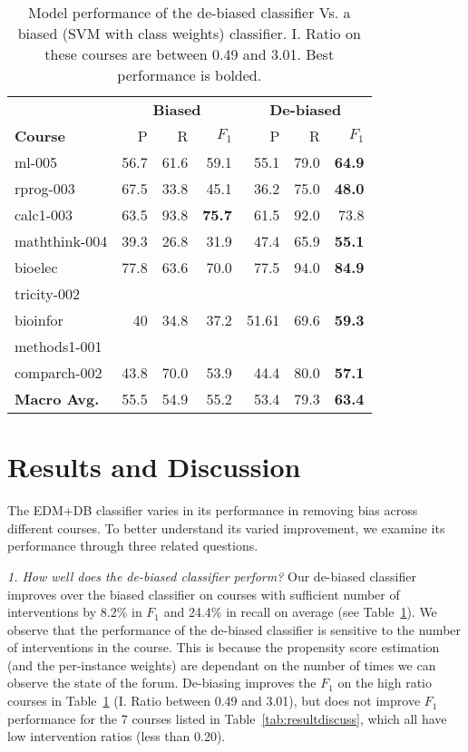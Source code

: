 \documentclass[11pt,a4paper]{article}
\begin{document}
\begin{table}
\centering
\def\arraystretch{1.15}%
\scriptsize
\begin{tabular}{|l|r|r|r||r|r|r|}
\hline
 &
 \multicolumn{3}{c||}{\textbf{Biased}} &
 \multicolumn{3}{c|}{\textbf{De-biased}} \\
 \cline{2-7}
\bf Course&  P&  R& $F_1$&  P&  R& $F_1$\\
\hline
\hline
{\sc ml-005} & 56.7& 61.6& 59.1& 55.1 & 79.0& \textbf{64.9}\\
\hline
{\sc rprog-003} & 67.5& 33.8& 45.1& 36.2& 75.0& \textbf{48.0}\\
\hline
{\sc calc1-003} & 63.5& 93.8& \textbf{75.7}& 61.5& 92.0& 73.8\\
\hline
{\sc maththink-004} & 39.3& 26.8& 31.9& 47.4& 65.9& \textbf{55.1}\\
\hline
{\sc bioelec} & 77.8& 63.6& 70.0& 77.5& 94.0& \textbf{84.9}\\
{\sc tricity-002} & &  &  & & & \\
\hline
{\sc bioinfor} & 40& 34.8& 37.2& 51.61& 69.6& \textbf{59.3}\\
{\sc methods1-001} & &  &  & & & \\
\hline
{\sc comparch-002} & 43.8& 70.0& 53.9& 44.4& 80.0& \textbf{57.1}\\
\hline
\hline
\textbf{Macro Avg.}& 55.5& 54.9& 55.2& 53.4& 79.3& \textbf{63.4}\\
\hline
\end{tabular}
\caption{Model performance of the de-biased 
classifier Vs. a biased (SVM with class weights) classifier. 
I. Ratio on these courses are between 0.49 and 3.01. Best 
performance is bolded. 
}
\label{tab:resultmain}
\end{table}


\section{Results and Discussion}
\label{sect:discuss}
The EDM+DB classifier varies in its performance in removing bias
across different courses. To better understand its varied improvement,
we examine its performance through three related questions.

{\it 1. How well does the de-biased classifier perform?}
Our de-biased classifier improves over the biased classifier on 
courses with sufficient number of interventions by 8.2\% in $F_1$ 
and 24.4\% in recall on average (see Table~\ref{tab:resultmain}).
We observe that the performance of the de-biased classifier is
sensitive to the number of interventions in the course. This is
because the propensity score estimation (and the per-instance 
weights) are dependant on the number of times we can observe the 
state of the forum. De-biasing improves the $F_1$ on the high
ratio courses in Table~\ref{tab:resultmain} (I. Ratio between 
0.49 and 3.01), but does not improve $F_1$ performance for the 7 
courses listed in Table~\ref{tab:resultdiscuss}, which all have 
low intervention ratios (less than 0.20).
\end{document}
